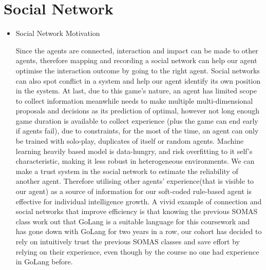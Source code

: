 \section{Social Network}

\begin{itemize}
\item Social Network Motivation
    \begin{flushleft}
    \setlength{\parindent}{2em}
     Since the agents are connected, interaction and impact can be made to other agents, therefore mapping and recording a social network can help our agent optimise the interaction outcome by going to the right agent. Social networks can also spot conflict in a system and help our agent identify its own position in the system. At last, due to this game's nature, an agent has limited scope to collect information meanwhile needs to make multiple multi-dimensional proposals and decisions as its prediction of optimal, however not long enough game duration is available to collect experience (plus the game can end early if agents fail), due to constraints, for the most of the time, an agent can only be trained with solo-play, duplicates of itself or random agents. Machine learning heavily based model is data-hungry, and risk overfitting to it self's characteristic, making it less robust in heterogeneous environments. We can make a trust system in the social network to estimate the reliability of another agent. Therefore utilising other agents' experience(that is visible to our agent) as a source of information for our soft-coded rule-based agent is effective for individual intelligence growth. A vivid example of connection and social networks that improve efficiency is that knowing the previous SOMAS class work out that GoLang is a suitable language for this coursework and has gone down with GoLang for two years in a row, our cohort has decided to rely on intuitively trust the previous SOMAS classes and save effort by relying on their experience, even though by the course no one had experience in GoLang before.


\end{flushleft}
\end{itemize}
